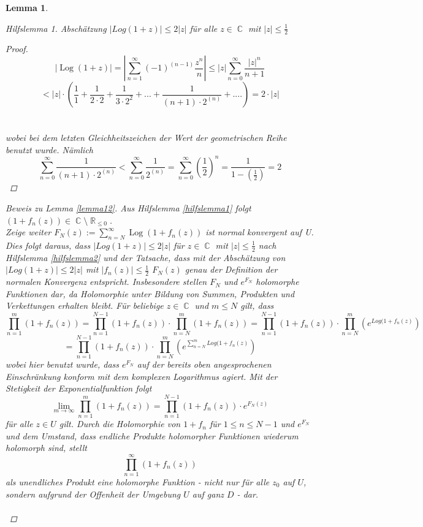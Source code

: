 \documentclass[10pt,a4paper]{article}
\theoremstyle{plain}
\newtheorem{lem}[thm]{Lemma}
\theoremstyle{definition}
\theoremstyle{remark}
\newtheorem{hilfslem}{Hilfslemma}
\DeclareMathOperator{\R}{\mathbb{R}}
\DeclareMathOperator{\C}{\mathbb{C}}
\DeclareMathOperator{\Log}{Log}
\begin{document}
\begin{lem}
\begin{hilfslem}
Abschätzung $ |Log(1+z)|\leq 2|z|$ für alle $z \in \C $ mit $ |z| \leq \frac{1}{2}$

\begin{proof}

$$|\Log(1+z)|= |\sum_{n = 1}^\infty (-1)^{(n-1)}\frac{z^{n}}{n}|\leq|z|\sum_{n = 0}^\infty\frac{|z|^{n}}{n + 1}$$
$$< |z|\cdot (\frac{1}{1}+\frac{1}{2\cdot 2}+\frac{1}{3 \cdot2^2}+...+\frac{1}{(n+1)\cdot2^(n)}+....) = 2\cdot|z| $$
\\
\\
wobei bei dem letzten Gleichheitszeichen der Wert der geometrischen Reihe benutzt wurde. Nämlich $$\sum_{n=0}^{\infty}\frac{1}{(n+1)\cdot2^{(n)}} < \sum_{n=0}^{\infty}\frac{1}{2^{(n)}} = \sum_{n=0}^{\infty}(\frac{1}{2})^n = \frac{1}{1-(\frac{1}{2})} = 2 $$

\end{proof}
\end{hilfslem}

\begin{proof}[Beweis zu Lemma \ref{lemma12}]
\noindent Aus Hilfslemma \ref{hilfslemma1} folgt $(1 + f_{n}(z)) \in \C \setminus \R_{\leq 0 }$. \\
 Zeige weiter $F_{N}(z) := \sum_{n = N}^\infty \Log( 1 + f_{n}(z))$ ist normal konvergent auf U. Dies folgt daraus, dass $| Log( 1 + z) | \leq 2|z| $ für $z \in \C$ mit $|z| \leq \frac{1}{2}$ nach Hilfslemma \ref{hilfslemma2}  und der Tatsache, dass mit der Abschätzung von $|Log(1+z)| \leq 2|z|$ mit $|f_n(z)|\leq \frac{1}{2}$ $F_{N}(z)$ genau der Definition der normalen Konvergenz entspricht.
Insbesondere stellen $F_{N}$ und $e^{F_{N}}$ holomorphe Funktionen dar, da Holomorphie unter Bildung von Summen, Produkten und Verkettungen erhalten bleibt. Für beliebige $z \in \C $ und $m\leq N$ gilt, dass 
$$\prod_{n = 1 }^{m}( 1 + f_{n}(z)) = \prod_{n = 1}^{N - 1}( 1 + f_{n}(z)) \cdot \prod_{n = N}^{m}( 1 + f_{n}(z))= \prod_{n = 1}^{N - 1}( 1 + f_{n}(z)) \cdot \prod_{n = N}^{m}(e^{Log( 1 + f_{n}(z)}) $$ $$= \prod_{n = 1}^{N - 1}( 1 + f_{n}(z)) \cdot \prod_{n = N}^{m}(e^{\sum_{n = N}^{m}Log( 1 + f_{n}(z)})$$
wobei hier benutzt wurde, dass $e^{F_{N}}$ auf der bereits oben angesprochenen Einschränkung konform mit dem komplexen Logarithmus agiert. Mit der Stetigkeit der Exponentialfunktion folgt $$\lim_{m\rightarrow\infty}\prod_{n=1}^m ( 1 + f_{n}(z)) =\prod_{n = 1}^{N - 1}(1 + f_{n}(z))\cdot e^{F_{N}(z)}$$ für alle $z \in U$ gilt. Durch die Holomorphie von $1+ f_{n}$ für $1 \leq n \leq N - 1$ und $e^{F_{N}}$ und dem Umstand, dass endliche Produkte holomorpher Funktionen wiederum holomorph sind, stellt $$\prod_{n =1}^{\infty}(1 +f_n (z))$$ als unendliches Produkt eine holomorphe Funktion - nicht nur für alle $z_0$ auf $U$, sondern aufgrund der Offenheit der Umgebung $U$ auf ganz $D$ - dar.
\\
\\
\end{proof}
\end{lem}
\end{document}
